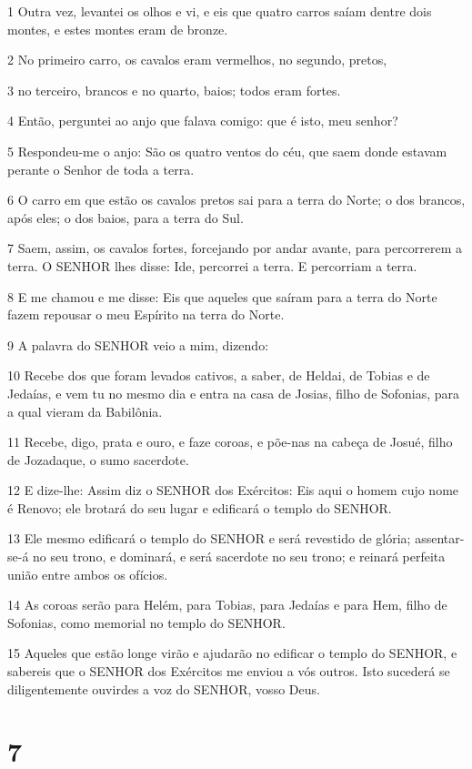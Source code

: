 \par 1 Outra vez, levantei os olhos e vi, e eis que quatro carros saíam dentre dois montes, e estes montes eram de bronze.
\par 2 No primeiro carro, os cavalos eram vermelhos, no segundo, pretos,
\par 3 no terceiro, brancos e no quarto, baios; todos eram fortes.
\par 4 Então, perguntei ao anjo que falava comigo: que é isto, meu senhor?
\par 5 Respondeu-me o anjo: São os quatro ventos do céu, que saem donde estavam perante o Senhor de toda a terra.
\par 6 O carro em que estão os cavalos pretos sai para a terra do Norte; o dos brancos, após eles; o dos baios, para a terra do Sul.
\par 7 Saem, assim, os cavalos fortes, forcejando por andar avante, para percorrerem a terra. O SENHOR lhes disse: Ide, percorrei a terra. E percorriam a terra.
\par 8 E me chamou e me disse: Eis que aqueles que saíram para a terra do Norte fazem repousar o meu Espírito na terra do Norte.
\par 9 A palavra do SENHOR veio a mim, dizendo:
\par 10 Recebe dos que foram levados cativos, a saber, de Heldai, de Tobias e de Jedaías, e vem tu no mesmo dia e entra na casa de Josias, filho de Sofonias, para a qual vieram da Babilônia.
\par 11 Recebe, digo, prata e ouro, e faze coroas, e põe-nas na cabeça de Josué, filho de Jozadaque, o sumo sacerdote.
\par 12 E dize-lhe: Assim diz o SENHOR dos Exércitos: Eis aqui o homem cujo nome é Renovo; ele brotará do seu lugar e edificará o templo do SENHOR.
\par 13 Ele mesmo edificará o templo do SENHOR e será revestido de glória; assentar-se-á no seu trono, e dominará, e será sacerdote no seu trono; e reinará perfeita união entre ambos os ofícios.
\par 14 As coroas serão para Helém, para Tobias, para Jedaías e para Hem, filho de Sofonias, como memorial no templo do SENHOR.
\par 15 Aqueles que estão longe virão e ajudarão no edificar o templo do SENHOR, e sabereis que o SENHOR dos Exércitos me enviou a vós outros. Isto sucederá se diligentemente ouvirdes a voz do SENHOR, vosso Deus.

\chapter{7}

